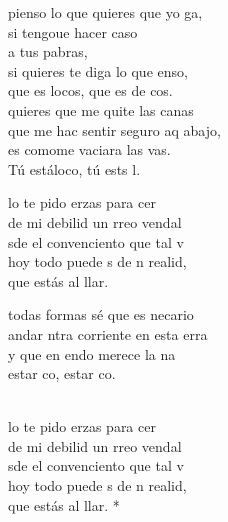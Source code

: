 \begin{cancion}%
	 pienso lo que quieres que yo ga,\\
	si tengoue hacer caso \\
	a tus pabras,\\
	si quieres te diga lo que enso,\\
	que es  locos, que es de cos.\\
	\jump
	 quieres que me quite las canas\\
	que me hac sentir seguro aq abajo,\\
	es comome vaciara las vas.\\
	Tú estáloco, tú ests l.\jump\\
	\begin{chorus}%
		lo te pido erzas para cer\\
		de mi debilid un rreo vendal\\
		sde el convenciento que tal v \\
		hoy todo puede s de n realid,\\
		que  estás al llar.   \jump\\
	\end{chorus}%
	 todas formas sé que es necario\\
	andar ntra corriente en esta erra\\
	y que en endo merece la na\\
	estar co, estar co.\\
	\jumjump\\
	\begin{chorus}%
		lo te pido erzas para cer\\
		de mi debilid un rreo vendal\chord{Mi}{7}{.  }\\
		sde el convenciento que tal v\chord{Mi}{}{ez} \\
		hoy todo puede s de n reali\chord{La}{}{da}d,\\
		que  estás al llar. * \jump\\
	\end{chorus}%
	\jump
\end{cancion}%

